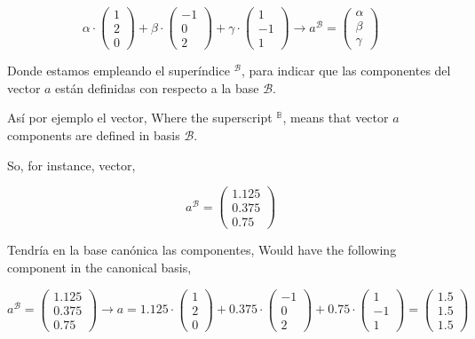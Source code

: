 \begin{equation*}
\alpha \cdot \begin{pmatrix}
1\\
2\\
0
\end{pmatrix}+\beta \cdot \begin{pmatrix}
-1\\
0\\
2
\end{pmatrix}+ \gamma \cdot \begin{pmatrix}
1\\
-1\\
1
\end{pmatrix} \rightarrow a^{\mathcal{B}}=\begin{pmatrix}
\alpha \\
\beta \\
\gamma
\end{pmatrix}
\end{equation*} 
\begin{paracol}{2}
Donde  estamos empleando el superíndice $^{\mathcal{B}}$, para indicar que las componentes del vector $a$ están definidas con respecto a la base $\mathcal{B}$.

Así por ejemplo el vector,
\switchcolumn
Where the superscript $^\mathbb{B}$, means that vector $a$ components are defined in basis $\mathcal{B}$.

So, for instance, vector,
\end{paracol} 
\begin{equation*}
a^{\mathcal{B}}=\begin{pmatrix}
1.125\\
0.375\\
0.75
\end{pmatrix}
\end{equation*}
\begin{paracol}{2}
Tendría en la base canónica las componentes,
\switchcolumn
Would have the following component in the canonical basis,
\end{paracol}
\begin{equation*}
a^{\mathcal{B}}=\begin{pmatrix}
1.125\\
0.375\\
0.75
\end{pmatrix} \rightarrow a= 1.125 \cdot \begin{pmatrix}
1\\
2\\
0
\end{pmatrix}+0.375 \cdot \begin{pmatrix}
-1\\
0\\
2
\end{pmatrix}+ 0.75 \cdot \begin{pmatrix}
1\\
-1\\
1
\end{pmatrix} =\begin{pmatrix}
1.5\\
1.5 \\
1.5
\end{pmatrix}
\end{equation*}

